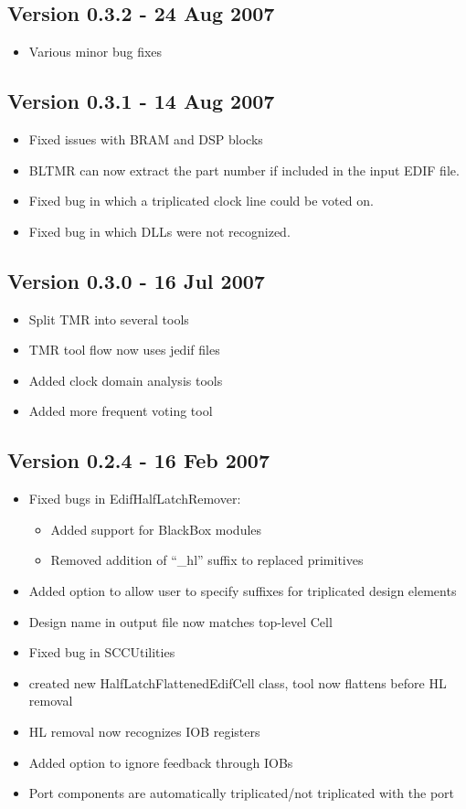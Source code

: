 \documentclass[english]{article}
\begin{document}
\subsection*{Version 0.3.2 - 24 Aug 2007}
\begin{itemize}
\item Various minor bug fixes
\end{itemize}

\subsection*{Version 0.3.1 - 14 Aug 2007}
\begin{itemize}
\item Fixed issues with BRAM and DSP blocks
\item BLTMR can now extract the part number if included in the input EDIF file.
\item Fixed bug in which a triplicated clock line could be voted on.
\item Fixed bug in which DLLs were not recognized.
\end{itemize}

\subsection*{Version 0.3.0 - 16 Jul 2007}
\begin{itemize}
\item Split TMR into several tools
\item TMR tool flow now uses jedif files
\item Added clock domain analysis tools
\item Added more frequent voting tool
\end{itemize}

\subsection*{Version 0.2.4 - 16 Feb 2007}
\begin{itemize}
\item Fixed bugs in EdifHalfLatchRemover: 
\begin{itemize}
\item Added support for BlackBox modules
\item Removed addition of ``\_hl'' suffix to replaced primitives
\end{itemize}
\item Added option to allow user to specify suffixes for triplicated design
elements
\item Design name in output file now matches top-level Cell
\item Fixed bug in SCCUtilities
\item created new HalfLatchFlattenedEdifCell class, tool now flattens before HL
removal
\item HL removal now recognizes IOB registers
\item Added option to ignore feedback through IOBs
\item Port components are automatically triplicated/not triplicated with the port
\end{itemize}
\end{document}
